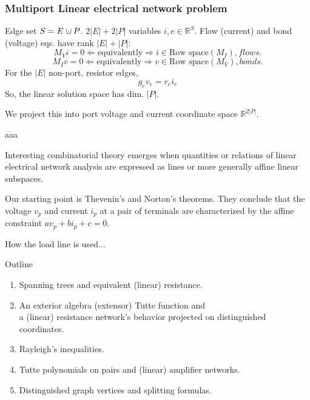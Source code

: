 \documentclass{beamer}
\newcommand{\dunion}
{\mbox{\hbox{\hskip0.45em$\cdot$\hskip-0.44em$\cup$\hskip0.2em}}}
\newcommand{\Reals}{\ensuremath{\mathbb{R}}}
\begin{document}
\begin{frame}
\frametitle{Multiport Linear electrical network problem}


Edge set $S= E\dunion P$. $2|E|+2|P|$ variables $i,e\in \Reals^S$.  
Flow (current) and bond (voltage) eqs. have rank 
$|E|+|P|$:
\[
M_Vi = 0 \Leftarrow\text{equivalently}\Rightarrow i\in\text{Row space}{(M_I)},flows.
\]
\[
M_Iv = 0 \Leftarrow\text{equivalently}\Rightarrow v\in\text{Row space}{(M_V)},bonds.
\]
For the $|E| $ non-port, resistor edges,
\[
g_ev_e = r_ei_e
\]
So, the linear solution space has dim. $|P|$.

We project this into port voltage and current coordinate space $\Reals^{2|P|}$.


  
\begin{theorem}
aaa
\end{theorem}
\end{frame}






\begin{frame}
Interesting combinatorial theory emerges when quantities or relations
of linear electrical network analysis are expressed as lines or more
generally affine linear subspaces.

Our starting point is Thevenin's and Norton's theorems.  They conclude that
the voltage $v_p$ and current $i_p$ at a pair of terminals are characterized
by the affine constraint $av_p + bi_p + c = 0$.  

How the load line is used...

\end{frame}



\begin{frame}{Outline}
\begin{enumerate}
\item Spanning trees and equivalent (linear) resistance.
\item An exterior algebra (extensor) Tutte function and\\
 a (linear) resistance network's
behavior projected on distinguished coordinates.
\item Rayleigh's inequalities.
\item Tutte polynomials on pairs and (linear) amplifier networks.
\item Distinguished graph vertices and splitting formulas.
\end{enumerate}
\end{frame}
\end{document}
